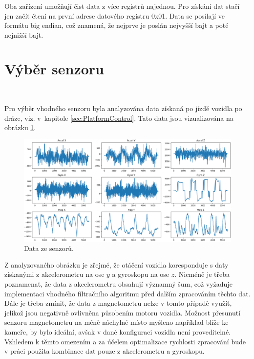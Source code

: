 Oba zařízení umožňují čist data z více registrů najednou. Pro získání dat stačí jen
začít čtení na první adrese datového registru 0x01. Data se posílají ve formátu big
endian, což znamená, že nejprve je poslán nejvyšší bajt a poté nejnižší bajt.

\section{Výběr senzoru}\

Pro výběr vhodného senzoru byla analyzována data získaná po jízdě vozidla po dráze,
viz. v~kapitole \ref{sec:PlatformControl}. Tato data jsou vizualizována na obrázku
\ref{fig:Sensors}.
\begin{figure}[!h]
    \centering
    \includegraphics[width = 1\linewidth]{Figures/Sensors.png}
    \caption{Data ze senzorů.}
    \label{fig:Sensors}
\end{figure}

Z analyzovaného obrázku je zřejmé, že otáčení vozidla koresponduje s daty získanými
z akcelerometru na ose $y$ a gyroskopu na ose $z$. Nicméně je třeba poznamenat, že
data z akcelerometru obsahují významný šum, což vyžaduje implementaci vhodného
filtračního algoritmu před dalším zpracováním těchto dat. Dále je třeba zmínit, že
data z magnetometru nelze v tomto případě využít, jelikož jsou negativně ovlivněna
působením motoru vozidla. Možnost přesunutí senzoru magnetometru na méně náchylné
místo myšleno například blíže ke kameře, by bylo ideální, avšak v dané konfiguraci
vozidla není proveditelné. Vzhledem k těmto omezením a za účelem optimalizace
rychlosti zpracování bude v práci použita kombinace dat pouze z akcelerometru a
gyroskopu.

\endinput
